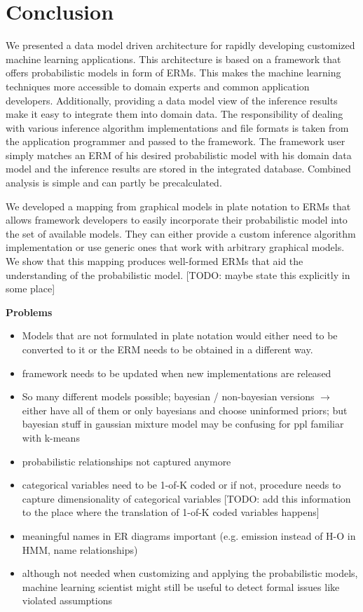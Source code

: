 \section{Conclusion}

We presented a data model driven architecture for rapidly developing customized machine learning applications. This architecture is based on a framework that offers probabilistic models in form of ERMs. This makes the machine learning techniques more accessible to domain experts and common application developers. Additionally, providing a data model view of the inference results make it easy to integrate them into domain data. The responsibility of dealing with various inference algorithm implementations and file formats is taken from the application programmer and passed to the framework. The framework user simply matches an ERM of his desired probabilistic model with his domain data model and the inference results are stored in the integrated database. Combined analysis is simple and can partly be precalculated.

We developed a mapping from graphical models in plate notation to ERMs that allows framework developers to easily incorporate their probabilistic model into the set of available models. They can either provide a custom inference algorithm implementation or use generic ones that work with arbitrary graphical models. We show that this mapping produces well-formed ERMs that aid the understanding of the probabilistic model. [TODO: maybe state this explicitly in some place]

\textbf{Problems}
\begin{itemize}
\item Models that are not formulated in plate notation would either need to be converted to it or the ERM needs to be obtained in a different way.
\item framework needs to be updated when new implementations are released
\item So many different models possible; bayesian / non-bayesian versions $\rightarrow$ either have all of them or only bayesians and choose uninformed priors; but bayesian stuff in gaussian mixture model may be confusing for ppl familiar with k-means
\item probabilistic relationships not captured anymore
\item categorical variables need to be 1-of-K coded or if not, procedure needs to capture dimensionality of categorical variables [TODO: add this information to the place where the translation of 1-of-K coded variables happens]
\item meaningful names in ER diagrams important (e.g. emission instead of H-O in HMM, name relationships)
\item although not needed when customizing and applying the probabilistic models, machine learning scientist might still be useful to detect formal issues like violated assumptions
\end{itemize}

